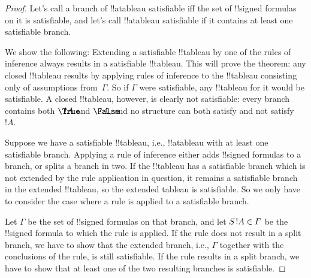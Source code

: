 \documentclass[../../../include/open-logic-section]{subfiles}
\begin{document}
\begin{proof}
Let's call a branch of !!a{tableau} satisfiable iff the set of
!!{signed formula}s on it is satisfiable, and let's call !!a{tableau}
satisfiable if it contains at least one satisfiable branch.

We show the following: Extending a satisfiable !!{tableau} by one of
the rules of inference always results in a satisfiable !!{tableau}.
This will prove the theorem: any closed !!{tableau} results by
applying rules of inference to the !!{tableau} consisting only of
assumptions from~$\Gamma$. So if $\Gamma$ were satisfiable, any
!!{tableau} for it would be satisfiable. A closed !!{tableau},
however, is clearly not satisfiable: every branch contains both
$\sFmla{\True}{!A}$ and $\sFmla{\False}{!A}$, and no structure can
both satisfy and not satisfy~$!A$.

Suppose we have a satisfiable !!{tableau}, i.e., !!a{tableau} with at
least one satisfiable branch. Applying a rule of inference either adds
!!{signed formula}s to a branch, or splits a branch in two. If the
!!{tableau} has a satisfiable branch which is not extended by the rule
application in question, it remains a satisfiable branch in the
extended !!{tableau}, so the extended tableau is satisfiable. So we
only have to consider the case where a rule is applied to a
satisfiable branch.

Let $\Gamma$ be the set of !!{signed formula}s on that branch, and
let $\sFmla{S}{!A} \in \Gamma$ be the !!{signed formula} to which the
rule is applied. If the rule does not result in a split branch, we
have to show that the extended branch, i.e., $\Gamma$ together with
the conclusions of the rule, is still satisfiable. If the rule results
in a split branch, we have to show that at least one of the two
resulting branches is satisfiable.
  

\end{proof}
\end{document}

